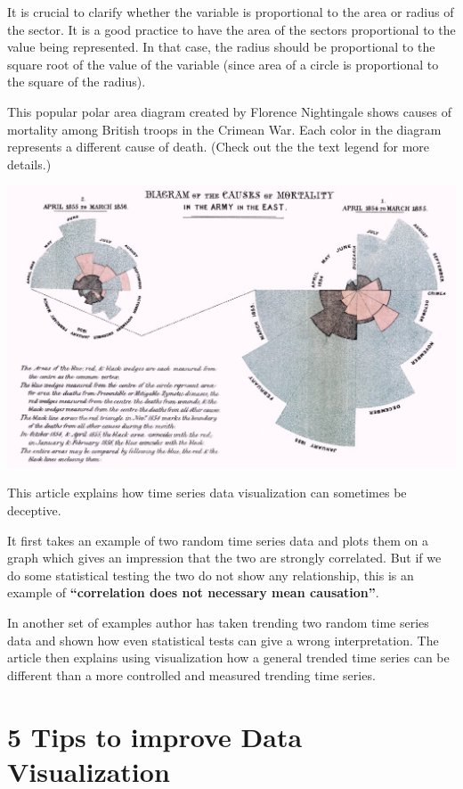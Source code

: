 \documentclass[]{book}
\theoremstyle{definition}
\theoremstyle{definition}
\theoremstyle{definition}
\theoremstyle{remark}
\begin{document}
It is crucial to clarify whether the variable is proportional to the
area or radius of the sector. It is a good practice to have the area of
the sectors proportional to the value being represented. In that case,
the radius should be proportional to the square root of the value of the
variable (since area of a circle is proportional to the square of the
radius).

This popular polar area diagram created by Florence Nightingale shows
causes of mortality among British troops in the Crimean War. Each color
in the diagram represents a different cause of death. (Check out the the
text legend for more details.)

\includegraphics{images/aya-polar.jpg} \citep{aya-time-series}

\citep{TimeSeries} This article explains how time series data
visualization can sometimes be deceptive.

It first takes an example of two random time series data and plots them
on a graph which gives an impression that the two are strongly
correlated. But if we do some statistical testing the two do not show
any relationship, this is an example of \textbf{``correlation does not
necessary mean causation''}.

In another set of examples author has taken trending two random time
series data and shown how even statistical tests can give a wrong
interpretation. The article then explains using visualization how a
general trended time series can be different than a more controlled and
measured trending time series.

\section{5 Tips to improve Data
Visualization}\label{tips-to-improve-data-visualization-1}
\end{document}
